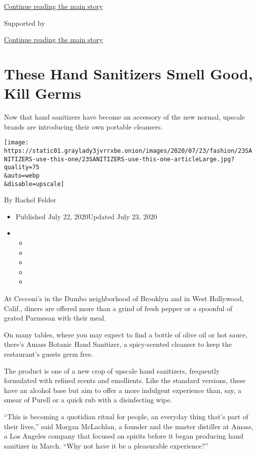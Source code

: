 \protect\hyperlink{after-top}{Continue reading the main story}

Supported by

\protect\hyperlink{after-sponsor}{Continue reading the main story}

\hypertarget{these-hand-sanitizers-smell-good-kill-germs}{%
\section{These Hand Sanitizers Smell Good, Kill
Germs}\label{these-hand-sanitizers-smell-good-kill-germs}}

Now that hand sanitizers have become an accessory of the new normal,
upscale brands are introducing their own portable cleansers.

\texttt{[image: https://static01.graylady3jvrrxbe.onion/images/2020/07/23/fashion/23SANITIZERS-use-this-one/23SANITIZERS-use-this-one-articleLarge.jpg?quality=75\\\&auto=webp\\\&disable=upscale]}

By Rachel Felder

\begin{itemize}
\item
  Published July 22, 2020Updated July 23, 2020
\item
  \begin{itemize}
  \item
  \item
  \item
  \item
  \item
  \end{itemize}
\end{itemize}

At Cecconi's in the Dumbo neighborhood of Brooklyn and in West
Hollywood, Calif., diners are offered more than a grind of fresh pepper
or a spoonful of grated Parmesan with their meal.

On many tables, where you may expect to find a bottle of olive oil or
hot sauce, there's Amass Botanic Hand Sanitizer, a spicy-scented
cleanser to keep the restaurant's guests germ free.

The product is one of a new crop of upscale hand sanitizers, frequently
formulated with refined scents and emollients. Like the standard
versions, these have an alcohol base but aim to offer a more indulgent
experience than, say, a smear of Purell or a quick rub with a
disinfecting wipe.

``This is becoming a quotidian ritual for people, an everyday thing
that's part of their lives,'' said Morgan McLachlan, a founder and the
master distiller at Amass, a Los Angeles company that focused on spirits
before it began producing hand sanitizer in March. ``Why not have it be
a pleasurable experience?''

